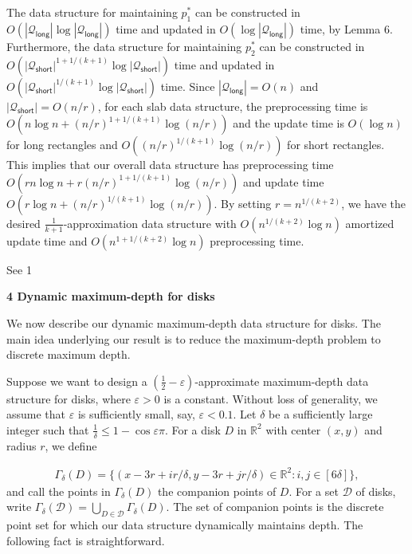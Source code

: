 \documentclass[10pt,a4paper]{article}
\begin{document}
The data structure for maintaining $p_{1}^{*}$ can be constructed in $O(|\mathcal{Q}_{\mathsf{long}}|\log|\mathcal{Q}_{\mathsf{long}}|)$ time and updated in $O(\log|\mathcal{Q}_{\mathsf{long}}|)$ time, by Lemma 6. Furthermore, the data structure for maintaining $p_{2}^{*}$ can be constructed in $O(|\mathcal{Q}_{\mathsf{short}}|^{1+1/(k+1)}\log|\mathcal{Q}_{\mathsf{short}}|)$ time and updated in $O(|\mathcal{Q}_{\mathsf{short}}|^{1/(k+1)}\log|\mathcal{Q}_{\mathsf{short}}|)$ time. Since $|\mathcal{Q}_{\mathsf{long}}|=O(n)$ and $|\mathcal{Q}_{\mathsf{short}}|=O(n/r)$, for each slab data structure, the preprocessing time is $O(n\log n+(n/r)^{1+1/(k+1)}\log(n/r))$ and the update time is $O(\log n)$ for long rectangles and $O((n/r)^{1/(k+1)}\log(n/r))$ for short rectangles. This implies that our overall data structure has preprocessing time $O(rn\log n+r(n/r)^{1+1/(k+1)}\log(n/r))$ and update time $O(r\log n+(n/r)^{1/(k+1)}\log(n/r))$. By setting $r=n^{1/(k+2)}$, we have the desired $\frac{1}{k+1}$-approximation data structure with $O(n^{1/(k+2)}\log n)$ amortized update time and $O(n^{1+1/(k+2)}\log n)$ preprocessing time.
\par
\par
See 1
\par
\par
\par\medskip\noindent\textbf{4 Dynamic maximum-depth for disks}\par
We now describe our dynamic maximum-depth data structure for disks. The main idea underlying our result is to reduce the maximum-depth problem to discrete maximum depth.
\par
\par
Suppose we want to design a $(\frac{1}{2}-\varepsilon)$-approximate maximum-depth data structure for disks, where $\varepsilon>0$ is a constant. Without loss of generality, we assume that $\varepsilon$ is sufficiently small, say, $\varepsilon<0.1$. Let $\delta$ be a sufficiently large integer such that $\frac{1}{\delta}\leq 1-\cos\varepsilon\pi$. For a disk $D$ in $\mathbb{R}^{2}$ with center $(x,y)$ and radius $r$, we define
\par
\[\begin{aligned}
\varGamma_{\delta}(D)=\{(x-3r+ir/\delta,y-3r+jr/\delta)\in\mathbb{R}^{2}:i,j%
\in[6\delta]\},
\end{aligned}\]
and call the points in $\varGamma_{\delta}(D)$ the companion points of $D$. For a set $\mathcal{D}$ of disks, write $\varGamma_{\delta}(\mathcal{D})=\bigcup_{D\in\mathcal{D}}\varGamma_{\delta}(D)$. The set of companion points is the discrete point set for which our data structure dynamically maintains depth. The following fact is straightforward.
\end{document}
